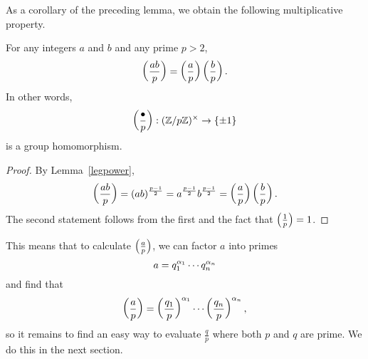 As a corollary of the preceding lemma, we obtain the following multiplicative property.
\begin{pr}\label{leg-grp-hom}
For any integers $a$ and $b$ and any prime $p>2$,
\[
\left( {\frac{ab}{p}} \right)=\left( {\frac{a}{p}} \right)\left( {\frac{b}{p}} \right).
\]
In other words,
\[
\left( {\frac{\bullet}{p}} \right):(\mathbb{Z}/p\mathbb{Z})^{\times}\to \{\pm 1\}
\]
is a group homomorphism.
\end{pr}
\begin{proof}
By Lemma~\ref{legpower},
\[
\left( {\frac{ab}{p}} \right)=(ab)^{\frac{p-1}2}=a^{\frac{p-1}2}b^{\frac{p-1}2} =\left( {\frac{a}{p}} \right)\left( {\frac{b}{p}} \right).
\]
The second statement follows from the first and the fact that $\left( {\frac{1}{p}} \right)=1$.
\end{proof}
This means that to calculate $\left( {\frac{a}{p}} \right)$, we can factor $a$ into primes
\[
a=q_1^{\alpha_1}\cdots q_n^{\alpha_n}
\]
and find that
\[
\left( {\frac{a}{p}} \right)=\left( {\frac{q_1}{p}} \right)^{\alpha_1}\cdots \left( {\frac{q_n}{p}} \right)^{\alpha_n},
\]
so it remains to find an easy way to evaluate $\frac{q}{p}$ where both $p$ and $q$ are prime. We do this in the next section.
